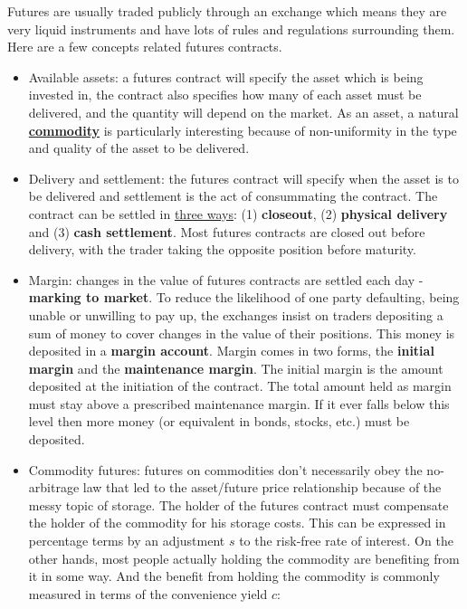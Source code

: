 Futures are usually traded publicly through an exchange which means they are very liquid
instruments and have lots of rules and regulations surrounding them. Here are a few
concepts related futures contracts.
\begin{itemize}
    \setlength\itemsep{0em}
    \item Available assets: a futures contract will specify the asset which is being invested in, the contract also specifies how many of each asset must be delivered, and the quantity will depend on the market. As an asset, a natural \href{https://en.wikipedia.org/wiki/Commodity}{\textbf{commodity}} is particularly interesting because of non-uniformity in the type and quality of the asset to be delivered.
    \item Delivery and settlement: the futures contract will specify when the asset is to be delivered and settlement is the act of consummating the contract. The contract can be settled in \href{https://financetrain.com/settlement-of-futures-contracts/}{three ways}: (1) \textbf{closeout}, (2) \textbf{physical delivery} and (3) \textbf{cash settlement}. Most futures contracts are closed out before delivery, with the trader taking the opposite position before maturity.
    \item Margin: changes in the value of futures contracts are settled each day - \textbf{marking to market}. To reduce the likelihood of one party defaulting, being unable or unwilling to pay up, the exchanges insist on traders depositing a sum of money to cover changes in the value of their positions. This money is deposited in a \textbf{margin account}. Margin comes in two forms, the \textbf{initial margin} and the \textbf{maintenance margin}. The initial margin is the amount deposited at the initiation of the contract. The total amount held as margin must stay above a prescribed maintenance margin. If it ever falls below this level then more money (or equivalent in bonds, stocks, etc.) must be deposited. 
    \item Commodity futures: futures on commodities don't necessarily obey the no-arbitrage law that led to the asset/future price relationship because of the messy topic of storage. The holder of the futures contract must compensate the holder of the commodity for his storage costs. This can be expressed in percentage terms by an adjustment $s$ to the risk-free rate of interest. On the other hands, most people actually holding the commodity are benefiting from it in some way. And the benefit from holding the commodity is commonly measured in terms of the convenience yield $c$:

\end{itemize}
